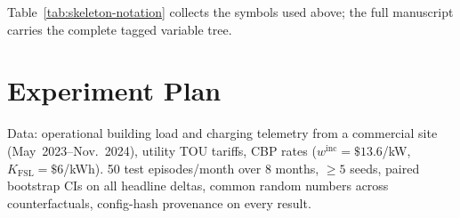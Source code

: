 \documentclass[letterpaper]{article}
\newcommand{\winc}{w^{\mathrm{inc}}}            %
\newcommand{\Kfsl}{K_{\mathrm{FSL}}}
\begin{document}
Table~\ref{tab:skeleton-notation} collects the symbols used above; the full
manuscript carries the complete tagged variable tree.

\section{Experiment Plan}\label{sec:expplan}

Data: operational building load and charging telemetry from a commercial
site (May~2023--Nov.~2024), utility TOU tariffs, CBP rates
($\winc{=}\$13.6$/kW, $\Kfsl{=}\$6$/kWh). 50 test episodes/month over 8
months, $\geq 5$ seeds, paired bootstrap CIs on all headline deltas,
common random numbers across counterfactuals, config-hash provenance on
every result.
\end{document}
